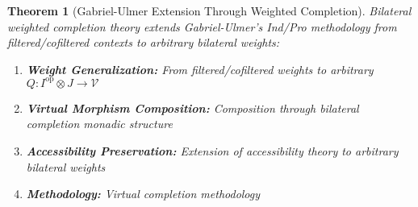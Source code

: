 \documentclass[11pt]{article}
\theoremstyle{plain}
\newtheorem{theorem}{Theorem}[section]
\theoremstyle{definition}
\theoremstyle{remark}
\newcommand{\V}{\mathcal{V}}
\newcommand{\op}{\mathrm{op}}
\begin{document}
\begin{theorem}[Gabriel-Ulmer Extension Through Weighted Completion]\label{thm:gabriel-ulmer-extension}
Bilateral weighted completion theory extends Gabriel-Ulmer's Ind/Pro methodology \cite{gabriel1971lokal,adamek1994locally} from filtered/cofiltered contexts to arbitrary bilateral weights:

\begin{enumerate}
\item \textbf{Weight Generalization:} From filtered/cofiltered weights to arbitrary $Q : I^{\op} \otimes J \to \V$

\item \textbf{Virtual Morphism Composition:} Composition through bilateral completion monadic structure

\item \textbf{Accessibility Preservation:} Extension of accessibility theory to arbitrary bilateral weights

\item \textbf{Methodology:} Virtual completion methodology
\end{enumerate}
\end{theorem}
\end{document}

